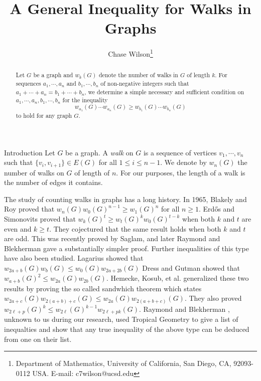 \documentclass[11pt,a4paper]{article}
\title{A General Inequality for Walks in Graphs}
\author{
Chase Wilson\thanks{Department of Mathematics, University of California, San Diego, CA, 92093-0112 USA. E-mail: c7wilson@ucsd.edu}}
\begin{document}
\date{}
\setlength{\droptitle}{-2.5cm}
\maketitle
\vspace{-0.5in}

\begin{abstract}
Let $G$ be a graph and $w_k(G)$ denote the number of walks in $G$ of length $k$. For sequences $a_1, \cdots, a_n$ and $b_1, \cdots, b_n$ of non-negative integers such that $a_1 + \cdots + a_n = b_1 + \cdots + b_n$, we determine a simple necessary and sufficient condition on $a_1, \cdots, a_n, b_1, \cdots, b_n$ for the inequality
\[
w_{a_1}(G) \cdots w_{a_n}(G) \geq w_{b_1}(G) \cdots w_{b_n}(G)
\]
to hold for any graph $G$. 
\end{abstract}
\begin{section}{Introduction}
Let $G$ be a graph. A \textit{walk} on $G$ is a sequence of vertices $v_1, \cdots, v_n$ such that $\{v_i, v_{i + 1} \} \in E(G)$ for all $1 \leq i \leq n - 1$. We denote by $w_n(G)$ the number of walks on $G$ of length of $n$. For our purposes, the length of a walk is the number of edges it contains.

\medskip

The study of counting walks in graphs has a long history. In 1965, Blakely and Roy \cite{BlR} proved that $w_n(G) w_0(G)^{n - 1} \geq w_1(G)^n$ for all $n \geq 1$. Erd\H{o}s and Simonovits \cite{ES} proved that $w_k(G)^t \geq w_t(G)^k w_0(G)^{t - k}$ when both $k$ and $t$ are even and $k \geq t$. They cojectured that the same result holds when both $k$ and $t$ are odd. This was recently proved by Saglam, and later Raymond and Blekherman \cite{BR} gave a substantially simpler proof. Further inequalities of this type have also been studied. Lagarius \cite{LM} showed that $w_{2a + b}(G) w_b(G) \leq w_0(G) w_{2a + 2b}(G)$ Dress and Gutman \cite{DG} showed that $w_{a + b}(G)^2 \leq w_{2a}(G) w_{2b}(G)$. Hemecke, Kosub, et al. \cite{HK} generalized these two results by proving the so called sandwhich theorem which states $w_{2a + c} (G)w_{2(a + b) + c}(G) \leq w_{2a}(G) w_{2(a + b + c)}(G)$. They also proved $w_{2 \ell + p}(G)^k \leq w_{2 \ell}(G)^{k - 1} w_{2 \ell + pk}(G)$. Raymond and Blekherman \cite{BR2}, unknown to us during our research, used Tropical Geometry to give a list of inequalties and show that any true inequality of the above type can be deduced from one on their list.

\medskip


\end{section}
\end{document}
